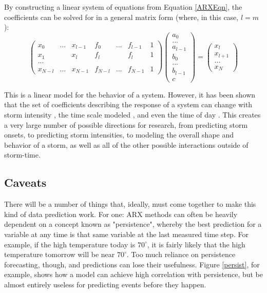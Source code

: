 By constructing a linear system of equations from Equation \ref{ARXEqn}, the coefficients can be solved for in a general matrix form (where, in this case, $l=m$):
\[
\left( \begin{array}{ccccccc}
x_0 & ... & x_{l-1} & f_0 & ... & f_{l-1} & 1\\
x_1 &     & x_l & f_l &  &f_l & 1\\
... &     &     &     &  &   & \\
x_{N-l} & ... & x_{N-1} & f_{N-l} & ... & f_{N-1} & 1
\end{array} \right)
\left(\begin{array}{c}
a_0\\...\\a_{l-1}\\b_0\\...\\b_{l-1}\\c
\end{array}\right)
=
\left(
\begin{array}{c}
x_l \\ x_{l+1} \\ ... \\ x_{N}
\end{array}
\right)
\]

This is a linear model for the behavior of a system. However, it has been shown that the set of coefficients describing the response of a system can change with storm intensity \cite{ARXEqn}, the time scale modeled \cite{Coupling}, and even the time of day \cite{VBzAL}. This creates a very large number of possible directions for research, from predicting storm onsets, to predicting storm intensities, to modeling the overall shape and behavior of a storm, as well as all of the other possible interactions outside of storm-time. 

\subsection{Caveats}
There will be a number of things that, ideally, must come together to make this kind of data prediction work. For one: ARX methods can often be heavily dependent on a concept known as "persistence", whereby the best prediction for a variable at any time is that same variable at the last measured time step. For example, if the high temperature today is $70^\circ$, it is fairly likely that the high temperature tomorrow will be near $70^\circ$. Too much reliance on persistence forecasting, though, and predictions can lose their usefulness. Figure \ref{persist}, for example, shows how a model can achieve high correlation with persistence, but be almost entirely useless for predicting events before they happen. 

